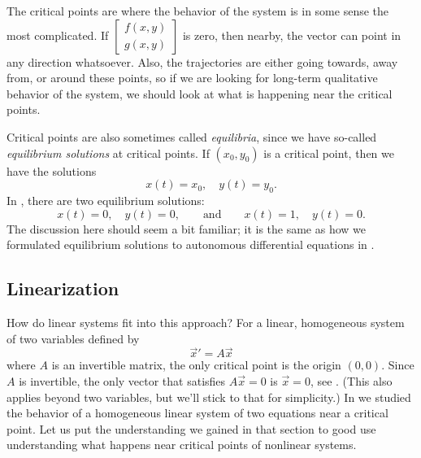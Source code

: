 The critical points are where the behavior of the system is
in some sense the most complicated.  If
$\left[ \begin{smallmatrix} f(x,y) \\ g(x,y) \end{smallmatrix} \right]$
is zero, then nearby, the vector can point in any direction whatsoever.
Also, the trajectories are either going towards, away from, or around these
points, so if we are looking for long-term qualitative behavior of the system, we
should look at what is happening near the critical points.

Critical points are also sometimes called
\emph{equilibria}, since we have so-called
\emph{equilibrium solutions} at critical points.
If $(x_0,y_0)$ is a critical point, then we have the solutions
\begin{equation*}
x(t) = x_0, \quad y(t) = y_0 .
\end{equation*}
In , there are two equilibrium
solutions:
\begin{equation*}
x(t) = 0, \quad y(t) = 0,
\qquad \text{and} \qquad
x(t) = 1, \quad y(t) = 0.
\end{equation*}
The discussion here should seem a bit familiar; it is the same as how we formulated equilibrium solutions to
autonomous differential equations in .  

\subsection{Linearization}

How do linear systems fit into this approach? For a linear, homogeneous system of two variables defined by
\begin{equation*}
\vec{x}' = A\vec{x}
\end{equation*}
where $A$ is an invertible matrix, the only critical point is
the origin $(0,0)$. Since $A$ is invertible, the only vector that satisfies $A\vec{x} = 0$ is $\vec{x} = 0$, see . (This also applies beyond two variables, but we'll stick to that for simplicity.) In  we studied the behavior of a homogeneous
linear system of two equations near a critical point. 
Let us put the understanding we gained in that section to good use
understanding what happens near critical points of nonlinear systems.

